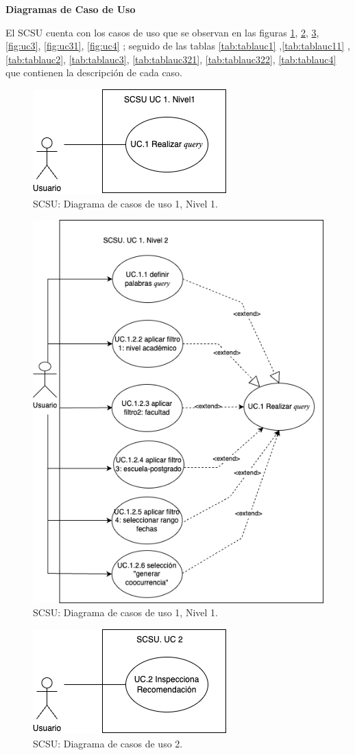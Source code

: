 \documentclass[
  12pt,
  openany]{book}
\begin{document}
\textbf{Diagramas de Caso de Uso}

El SCSU cuenta con los casos de uso que se observan en las figuras \ref{fig:uc1}, \ref{fig:uc12}, \ref{fig:uc2}, \ref{fig:uc3}, \ref{fig:uc31}, \ref{fig:uc4} ; seguido de las tablas \ref{tab:tablauc1} ,\ref{tab:tablauc11} , \ref{tab:tablauc2}, \ref{tab:tablauc3}, \ref{tab:tablauc321}, \ref{tab:tablauc322}, \ref{tab:tablauc4} que contienen la descripción de cada caso.

\begin{figure}

{\centering \includegraphics[width=0.4\linewidth]{images/05-desarrollo/4_ciclo/UC/SCSU_UC1_nivel1} 

}

\caption{SCSU: Diagrama de casos de uso 1, Nivel 1.}\label{fig:uc1}
\end{figure}

\begin{figure}

{\centering \includegraphics[width=0.5\linewidth]{images/05-desarrollo/4_ciclo/UC/SCSU_UC1_nivel2} 

}

\caption{SCSU: Diagrama de casos de uso 1, Nivel 1.}\label{fig:uc12}
\end{figure}

\begin{figure}

{\centering \includegraphics[width=0.4\linewidth]{images/05-desarrollo/4_ciclo/UC/SCSU_UC2_nivel1} 

}

\caption{SCSU: Diagrama de casos de uso 2.}\label{fig:uc2}
\end{figure}
\end{document}
